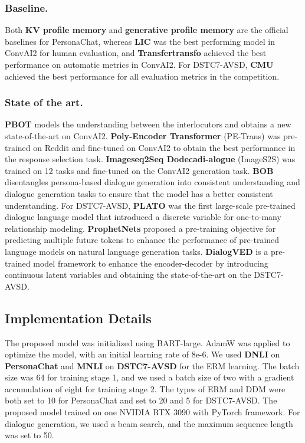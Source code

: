\documentclass[letterpaper]{article} \usepackage{aaai23}  \usepackage{times}  \usepackage{helvet}  \usepackage{courier}  \usepackage[hyphens]{url}  \usepackage{graphicx} \urlstyle{rm} \def\UrlFont{\rm}  \usepackage{natbib}  \usepackage{caption} \frenchspacing  \setlength{\pdfpagewidth}{8.5in}  \setlength{\pdfpageheight}{11in}  \usepackage{algorithm}
\begin{document}
\subsubsection{Baseline.}
Both \textbf{KV profile memory} and \textbf{generative profile memory} \cite{Zhang2018} are the official baselines for PersonaChat, whereas \textbf{LIC} \cite{Golovanov2020} was the best performing model in ConvAI2 for human evaluation, and \textbf{Transfertransfo} \cite{Wolf2019} achieved the best performance on automatic metrics in ConvAI2. For DSTC7-AVSD, \textbf{CMU} \cite{Sanabria2018} achieved the best performance for all evaluation metrics in the competition.
\subsubsection{State of the art.}
\textbf{PBOT} \cite{Liu2020} models the understanding between the interlocutors and obtains a new state-of-the-art on ConvAI2. \textbf{Poly-Encoder Transformer} (PE-Trans) \cite{Humeau2019} was pre-trained on Reddit and fine-tuned on ConvAI2 to obtain the best performance in the response selection task. \textbf{Imageseq2Seq Dodecadi-alogue} (ImageS2S) \cite{Shuster2020} was trained on 12 tasks and fine-tuned on the ConvAI2 generation task. \textbf{BOB} \cite{Song2021} disentangles persona-based dialogue generation into consistent understanding and dialogue generation tasks to ensure that the model has a better consistent understanding. For DSTC7-AVSD, \textbf{PLATO} \cite{Bao2020} was the first large-scale pre-trained dialogue language model that introduced a discrete variable for one-to-many relationship modeling. \textbf{ProphetNets} \cite{Qi2020} proposed a pre-training objective for predicting multiple future tokens to enhance the performance of pre-trained language models on natural language generation tasks. \textbf{DialogVED} \cite{Chen2022} is a pre-trained model framework to enhance the encoder-decoder by introducing continuous latent variables and obtaining the state-of-the-art on the DSTC7-AVSD.

\subsection{Implementation Details}
The proposed model was initialized using BART-large. AdamW \cite{Loshchilov2017} was applied to optimize the model, with an initial learning rate of 8e-6. We used \textbf{DNLI} on \textbf{PersonaChat} and \textbf{MNLI} on \textbf{DSTC7-AVSD} for the ERM learning. The batch size was 64 for training stage 1, and we used a batch size of two with a gradient accumulation of eight for training stage 2. The types of ERM and DDM were both set to 10 for PersonaChat and set to 20 and 5 for DSTC7-AVSD. The proposed model trained on one NVIDIA RTX 3090 with PyTorch framework. For dialogue generation, we used a beam search, and the maximum sequence length was set to 50. 
\end{document}
